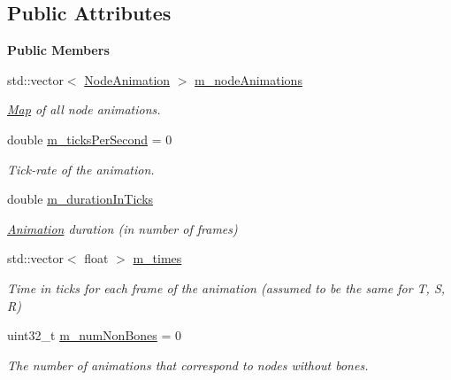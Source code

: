 \subsection*{Public Attributes}
\begin{Indent}\textbf{ Public Members}\par
\begin{DoxyCompactItemize}
\item 
std\+::vector$<$ \mbox{\hyperlink{classrev_1_1_node_animation}{Node\+Animation}} $>$ \mbox{\hyperlink{classrev_1_1_animation_adb990389fc3a35fadae1a59246aa329e}{m\+\_\+node\+Animations}}
\begin{DoxyCompactList}\small\item\em \mbox{\hyperlink{classrev_1_1_map}{Map}} of all node animations. \end{DoxyCompactList}\item 
\mbox{\label{classrev_1_1_animation_a73017925f3b37e1eac6e56c8dd585276}} 
double \mbox{\hyperlink{classrev_1_1_animation_a73017925f3b37e1eac6e56c8dd585276}{m\+\_\+ticks\+Per\+Second}} = 0
\begin{DoxyCompactList}\small\item\em Tick-\/rate of the animation. \end{DoxyCompactList}\item 
\mbox{\label{classrev_1_1_animation_a62bdd3aa8adf2866f047ab8e2183f263}} 
double \mbox{\hyperlink{classrev_1_1_animation_a62bdd3aa8adf2866f047ab8e2183f263}{m\+\_\+duration\+In\+Ticks}}
\begin{DoxyCompactList}\small\item\em \mbox{\hyperlink{classrev_1_1_animation}{Animation}} duration (in number of frames) \end{DoxyCompactList}\item 
\mbox{\label{classrev_1_1_animation_a3f865edcdfaee9ca5f2a218ee723105e}} 
std\+::vector$<$ float $>$ \mbox{\hyperlink{classrev_1_1_animation_a3f865edcdfaee9ca5f2a218ee723105e}{m\+\_\+times}}
\begin{DoxyCompactList}\small\item\em Time in ticks for each frame of the animation (assumed to be the same for T, S, R) \end{DoxyCompactList}\item 
\mbox{\label{classrev_1_1_animation_a4c1dafb178def2885f9801e31c51e593}} 
uint32\+\_\+t \mbox{\hyperlink{classrev_1_1_animation_a4c1dafb178def2885f9801e31c51e593}{m\+\_\+num\+Non\+Bones}} = 0
\begin{DoxyCompactList}\small\item\em The number of animations that correspond to nodes without bones. \end{DoxyCompactList}\end{DoxyCompactItemize}
\end{Indent}
